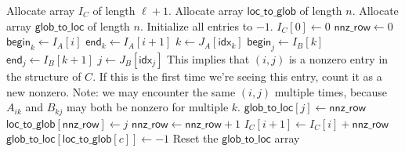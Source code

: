 \documentclass[12pt]{article}
\DeclareMathOperator{\nnz}{nnz}
\begin{document}
\begin{algorithm}[H]
   \caption{Compute $\nnz(C)$ where $C = AB$, fill in the $I_C$ array in CSR format.}
   \begin{algorithmic}
      \State Allocate array $I_C$ of length $\ell + 1$.
      \State Allocate array $\textsf{loc\_to\_glob}$ of length $n$.
      \State Allocate array $\textsf{glob\_to\_loc}$ of length $n$. Initialize all entries to $-1$.
      \State $I_C[0] \gets 0$
         \State $\textsf{nnz\_row} \gets 0$
         \State $\textsf{begin}_k \gets I_A[i]$
         \State $\textsf{end}_k \gets I_A[i+1]$
            \State $k \gets J_A[\textsf{idx}_k]$ 
%
            \State $\textsf{begin}_j \gets I_B[k]$
            \State $\textsf{end}_j \gets I_B[k+1]$
%
               \State $j \gets J_B[\textsf{idx}_j]$
               \State This implies that $(i,j)$ is a nonzero entry in the structure of $C$. If this is the first time we're seeing this entry, count it as a new nonzero. Note: we may encounter the same $(i,j)$ multiple times, because $A_{ik}$ and $B_{kj}$ may both be nonzero for multiple $k$.
                  \State $\textsf{glob\_to\_loc}[j] \gets \textsf{nnz\_row}$
                  \State $\textsf{loc\_to\_glob}[\textsf{nnz\_row}] \gets j$
                  \State $\textsf{nnz\_row} \gets \textsf{nnz\_row} + 1$
               \EndIf
            \EndFor
         \EndFor
         \State $I_C[i+1] \gets I_C[i] + \textsf{nnz\_row}$
            \State $\textsf{glob\_to\_loc}[\textsf{loc\_to\_glob}[c]] \gets -1$
            \Comment Reset the $\textsf{glob\_to\_loc}$ array
         \EndFor
      \EndFor
   \end{algorithmic}
\end{algorithm}
\end{document}
